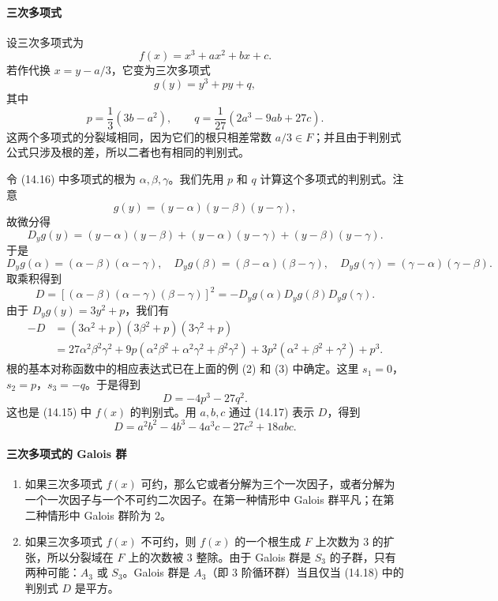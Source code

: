 \paragraph{三次多项式}
设三次多项式为
\begin{equation}
f(x)=x^3+ax^2+bx+c.\tag{14.15}
\end{equation}
若作代换 $x=y-a/3$，它变为三次多项式
\begin{equation}
g(y)=y^3+py+q,\tag{14.16}
\end{equation}
其中
\begin{equation}
p=\frac{1}{3}(3b-a^2),\qquad q=\frac{1}{27}(2a^3-9ab+27c).\tag{14.17}
\end{equation}
这两个多项式的分裂域相同，因为它们的根只相差常数 $a/3\in F$；并且由于判别式公式只涉及根的差，所以二者也有相同的判别式。

令 (14.16) 中多项式的根为 $\alpha,\beta,\gamma$。我们先用 $p$ 和 $q$ 计算这个多项式的判别式。注意
\[
g(y)=(y-\alpha)(y-\beta)(y-\gamma),
\]
故微分得
\[
D_yg(y)=(y-\alpha)(y-\beta)+(y-\alpha)(y-\gamma)+(y-\beta)(y-\gamma).
\]
于是
\[
D_yg(\alpha)=(\alpha-\beta)(\alpha-\gamma),
\quad
D_yg(\beta)=(\beta-\alpha)(\beta-\gamma),
\quad
D_yg(\gamma)=(\gamma-\alpha)(\gamma-\beta).
\]
取乘积得到
\[
D=[(\alpha-\beta)(\alpha-\gamma)(\beta-\gamma)]^2=-D_yg(\alpha)D_yg(\beta)D_yg(\gamma).
\]
由于 $D_yg(y)=3y^2+p$，我们有
\[
\begin{aligned}
-D&=(3\alpha^2+p)(3\beta^2+p)(3\gamma^2+p)\\
&=27\alpha^2\beta^2\gamma^2
+9p(\alpha^2\beta^2+\alpha^2\gamma^2+\beta^2\gamma^2)
+3p^2(\alpha^2+\beta^2+\gamma^2)+p^3.
\end{aligned}
\]
根的基本对称函数中的相应表达式已在上面的例 (2) 和 (3) 中确定。这里 $s_1=0$，$s_2=p$，$s_3=-q$。于是得到
\begin{equation}
D=-4p^3-27q^2.\tag{14.18}
\end{equation}
这也是 (14.15) 中 $f(x)$ 的判别式。用 $a,b,c$ 通过 (14.17) 表示 $D$，得到
\begin{equation}
D=a^2b^2-4b^3-4a^3c-27c^2+18abc.\tag{14.18'}
\end{equation}

\paragraph{三次多项式的 Galois 群}
\begin{enumerate}[label=\alph*.]
\item 如果三次多项式 $f(x)$ 可约，那么它或者分解为三个一次因子，或者分解为一个一次因子与一个不可约二次因子。在第一种情形中 Galois 群平凡；在第二种情形中 Galois 群阶为 $2$。

\item 如果三次多项式 $f(x)$ 不可约，则 $f(x)$ 的一个根生成 $F$ 上次数为 $3$ 的扩张，所以分裂域在 $F$ 上的次数被 $3$ 整除。由于 Galois 群是 $S_3$ 的子群，只有两种可能：$A_3$ 或 $S_3$。Galois 群是 $A_3$（即 $3$ 阶循环群）当且仅当 (14.18) 中的判别式 $D$ 是平方。
\end{enumerate}

